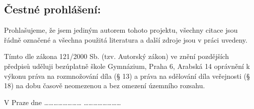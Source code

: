 \clearpageenabledfalse %
\newpage


\mbox{}
\vfill
\begin{Large}
\section*{Čestné prohlášení:}
\end{Large}
\par Prohlašujeme, že jsem jediným autorem tohoto projektu, všechny citace jsou řádně označené a všechna použitá literatura a další zdroje jsou v práci uvedeny. 
\par Tímto dle zákona 121/2000 Sb. (tzv. Autorský zákon) ve znění pozdějších předpisů uděluji bezúplatně škole Gymnázium, Praha 6, Arabská 14 oprávnění k výkonu práva na rozmnožování díla (§ 13) a práva na sdělování díla veřejnosti (§ 18) na dobu časově neomezenou a bez omezení územního rozsahu. 

\vspace{40pt}
\noindent
V Praze dne …………………… \hspace{20pt} …………………… \\


\clearpageenabledtrue %